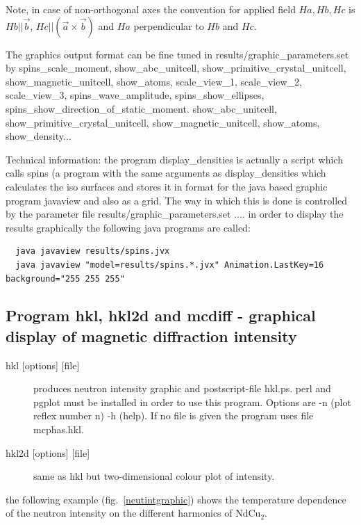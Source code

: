                          Note, in case of non-orthogonal axes the convention 
                           for applied field $Ha, Hb,Hc$ 
                            is $Hb||\vec b$, $Hc||(\vec a \times \vec b)$ and $Ha$ perpendicular to $Hb$ and $Hc$.


  The graphics output format can be fine tuned in {\prg results/graphic\_parameters.set} 
  by  {\prg spins\_scale\_moment},
{\prg show\_abc\_unitcell, show\_primitive\_crystal\_unitcell, show\_magnetic\_unitcell, show\_atoms, 
scale\_view\_1,
scale\_view\_2, scale\_view\_3},  
{\prg spins\_wave\_amplitude, spins\_show\_ellipses, spins\_show\_direction\_of\_static\_moment}.
{\prg show\_abc\_unitcell, show\_primitive\_crystal\_unitcell, show\_magnetic\_unitcell, show\_atoms, %
 show\_density}...

Technical information: the program {\prg display\_densities} 
is actually a script which
calls  {\prg spins} 
 (a program with the same arguments as {\prg display\_densities}
which calculates the iso surfaces and stores
it in format for the java based graphic program {\prg javaview} and
also as a grid. The way in which this is done is controlled by 
the parameter file {\prg results/graphic\_parameters.set}
.... in  order to display the results graphically the following java
programs are called:
\begin{verbatim}
  java javaview results/spins.jvx
  java javaview "model=results/spins.*.jvx" Animation.LastKey=16 background="255 255 255"
\end{verbatim}







\subsection{Program {\prg hkl}, {\prg hkl2d} and {\prg mcdiff} - graphical %
display of magnetic diffraction intensity}
\begin{description} 
\item [{{\prg hkl} [options] [file]} ]                   produces neutron intensity graphic
 and postscript-file {\prg hkl.ps}. {\prg perl} and
{\prg pgplot} must be installed in order to use this program.
 Options are -n (plot reflex number n)
-h (help). If no file is given the program uses file {\prg mcphas.hkl}.
\item [{{\prg hkl2d} [options] [file]} ]   same as {\prg hkl} but two-dimensional colour %
plot of intensity.
\end{description} 
the following example (fig.~\ref{neutintgraphic}) shows the temperature dependence of the neutron intensity
on the different harmonics of NdCu$_2$.

